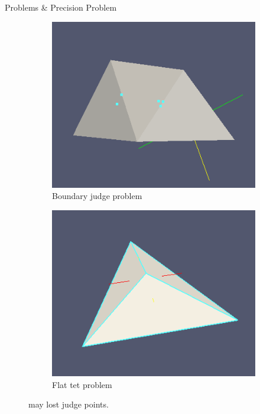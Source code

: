 \documentclass{beamer}
\begin{document}
\begin{frame} {Problems \& Precision Problem}
  \begin{figure}
    \begin{subfigure}[b]{0.4\textwidth}
      \includegraphics[width=\textwidth]{jbn0}
      \caption[]{Boundary judge problem}
    \end{subfigure}
    \begin{subfigure}[b]{0.4\textwidth}
      \includegraphics[width=\textwidth]{jbn1}
      \caption[]{Flat tet problem}
    \end{subfigure}
    \caption[]{may lost judge points.}
  \end{figure}
\end{frame}
\end{document}
